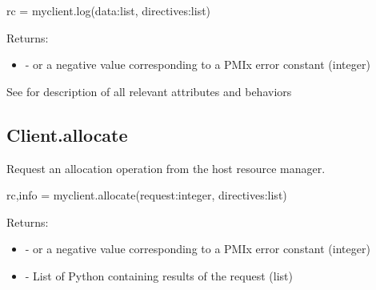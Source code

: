 \format

\pyspecificstart
\begin{codepar}
rc = myclient.log(data:list, directives:list)
\end{codepar}
\pyspecificend

\begin{arglist}
\end{arglist}

Returns:

\begin{itemize}
    \item {} -  or a negative value corresponding to a PMIx error constant (integer)
\end{itemize}


See  for description of all relevant attributes and behaviors


\subsection{Client.allocate}

\summary

Request an allocation operation from the host resource manager.

\format

\pyspecificstart
\begin{codepar}
rc,info = myclient.allocate(request:integer, directives:list)
\end{codepar}
\pyspecificend

\begin{arglist}
\end{arglist}

Returns:

\begin{itemize}
    \item {} -  or a negative value corresponding to a PMIx error constant (integer)
    \item {} - List of Python  containing results of the request (list)
\end{itemize}


